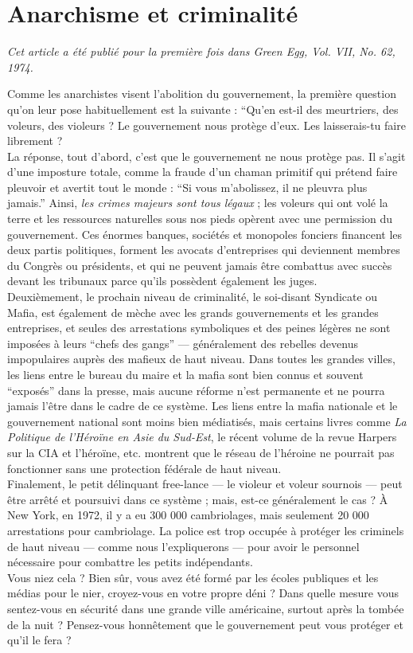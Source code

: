 \chapter{Anarchisme et criminalité}

\emph{Cet article a été publié pour la première fois dans Green Egg, Vol. VII, No. 62, 1974.\\}

Comme les anarchistes visent l'abolition du gouvernement, la première question qu'on leur pose habituellement est la suivante : ``Qu'en est-il des meurtriers, des voleurs, des violeurs ? Le gouvernement nous protège d'eux. Les laisserais-tu faire librement ?\\
La réponse, tout d'abord, c'est que le gouvernement ne nous protège pas. Il s'agit d'une imposture totale, comme la fraude d'un chaman primitif qui prétend faire pleuvoir et avertit tout le monde : ``Si vous m'abolissez, il ne pleuvra plus jamais.'' Ainsi, \emph{les crimes majeurs sont tous légaux} ; les voleurs qui ont volé la terre et les ressources naturelles sous nos pieds opèrent avec une permission du gouvernement. Ces énormes banques, sociétés et monopoles fonciers financent les deux partis politiques, forment les avocats d'entreprises qui deviennent membres du Congrès ou présidents, et qui ne peuvent jamais être combattus avec succès devant les tribunaux parce qu'ils possèdent également les juges.\\
Deuxièmement, le prochain niveau de criminalité, le soi-disant Syndicate ou Mafia, est également de mèche avec les grands gouvernements et les grandes entreprises, et seules des arrestations symboliques et des peines légères ne sont imposées à leurs ``chefs des gangs'' --- généralement des rebelles devenus impopulaires auprès des mafieux de haut niveau. Dans toutes les grandes villes, les liens entre le bureau du maire et la mafia sont bien connus et souvent ``exposés'' dans la presse, mais aucune réforme n'est permanente et ne pourra jamais l'être dans le cadre de ce système. Les liens entre la mafia nationale et le gouvernement national sont moins bien médiatisés, mais certains livres comme \emph{La Politique de l'Héroïne en Asie du Sud-Est}, le récent volume de la revue Harpers sur la CIA et l'héroïne, etc. montrent que le réseau de l'héroine ne pourrait pas fonctionner sans une protection fédérale de haut niveau.\\
Finalement, le petit délinquant free-lance --- le violeur et voleur sournois --- peut être arrêté et poursuivi dans ce système ; mais, est-ce généralement le cas ? À New York, en 1972, il y a eu 300 000 cambriolages, mais seulement 20 000 arrestations pour cambriolage. La police est trop occupée à protéger les criminels de haut niveau --- comme nous l'expliquerons --- pour avoir le personnel nécessaire pour combattre les petits indépendants.\\
Vous niez cela ? Bien sûr, vous avez été formé par les écoles publiques et les médias pour le nier, croyez-vous en votre propre déni ? Dans quelle mesure vous sentez-vous en sécurité dans une grande ville américaine, surtout après la tombée de la nuit ? Pensez-vous honnêtement que le gouvernement peut vous protéger et qu'il le fera ?

